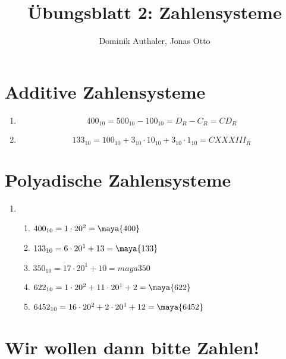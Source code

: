 \documentclass[a4paper]{article}
\author{Dominik Authaler, Jonas Otto}
\title{Übungsblatt 2: Zahlensysteme}
\begin{document}
\maketitle

\section{Additive Zahlensysteme}

\begin{enumerate}[label=\Roman*)]
    \item
        \begin{equation}
            400_{10} = 500_{10} - 100_{10} = D_R - C_R = \textit{CD}_R
        \end{equation}
    \item
        \begin{equation}
            133_{10} = 100_{10} + 3_{10} \cdot 10_{10} + 3_{10} \cdot 1_{10} = \textit{CXXXIII}_R
        \end{equation}
        
\end{enumerate}

\section{Polyadische Zahlensysteme}
\begin{enumerate}[label=\alph*)]
    \item
        \begin{enumerate}[label=\Roman*)]
            \item $ 400_{10} = 1 \cdot 20^2 = \maya{400} $ 

            \item $ 133_{10} = 6 \cdot 20^1 + 13 = \maya{133} $ 

            \item $ 350_{10} = 17 \cdot 20^1 + 10 = maya{350} $ 

            \item $ 622_{10} = 1 \cdot 20^2 + 11 \cdot 20^1 + 2 = \maya{622} $ 

            \item $ 6452_{10} = 16 \cdot 20^2 + 2 \cdot 20^1 + 12 = \maya{6452} $ 
        \end{enumerate}
\end{enumerate}

\section{Wir wollen dann bitte Zahlen!}
\end{document}
